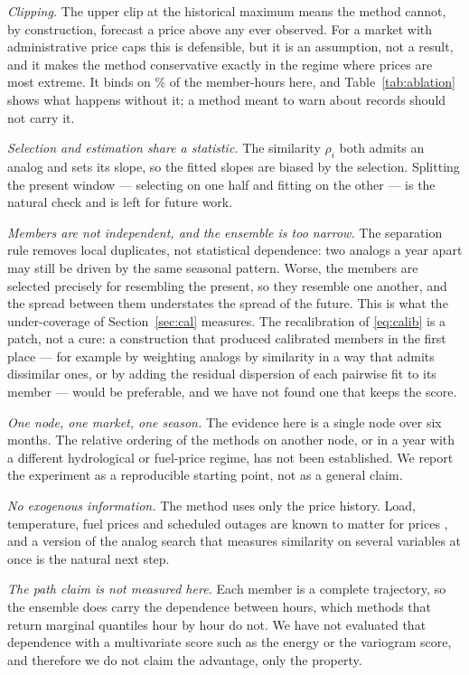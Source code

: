 \documentclass[12pt,a4paper]{article}
\begin{document}
\textit{Clipping.} The upper clip at the historical maximum means the method
cannot, by construction, forecast a price above any ever observed. For a
market with administrative price caps this is defensible, but it is an
assumption, not a result, and it makes the method conservative exactly in the
regime where prices are most extreme. It binds on \CLIPRATE\% of the
member-hours here, and Table~\ref{tab:ablation} shows what happens without it;
a method meant to warn about records should not carry it.

\textit{Selection and estimation share a statistic.} The similarity $\rho_i$
both admits an analog and sets its slope, so the fitted slopes are biased by
the selection. Splitting the present window — selecting on one half and
fitting on the other — is the natural check and is left for future work.

\textit{Members are not independent, and the ensemble is too narrow.} The
separation rule removes local duplicates, not statistical dependence: two
analogs a year apart may still be driven by the same seasonal pattern. Worse,
the members are selected precisely for resembling the present, so they resemble
one another, and the spread between them understates the spread of the future.
This is what the under-coverage of Section~\ref{sec:cal} measures. The
recalibration of \eqref{eq:calib} is a patch, not a cure: a construction that
produced calibrated members in the first place — for example by weighting
analogs by similarity in a way that admits dissimilar ones, or by adding the
residual dispersion of each pairwise fit to its member — would be preferable,
and we have not found one that keeps the score.

\textit{One node, one market, one season.} The evidence here is a single node
over six months. The relative ordering of the methods on another node, or in a
year with a different hydrological or fuel-price regime, has not been
established. We report the experiment as a reproducible starting point, not as
a general claim.

\textit{No exogenous information.} The method uses only the price history.
Load, temperature, fuel prices and scheduled outages are known to matter for
prices \citep{Weron2014,Uniejewski2019}, and a version of the analog search
that measures similarity on several variables at once is the natural next
step.

\textit{The path claim is not measured here.} Each member is a complete
trajectory, so the ensemble does carry the dependence between hours, which
methods that return marginal quantiles hour by hour do not. We have not
evaluated that dependence with a multivariate score such as the energy or the
variogram score, and therefore we do not claim the advantage, only the
property.
\end{document}
